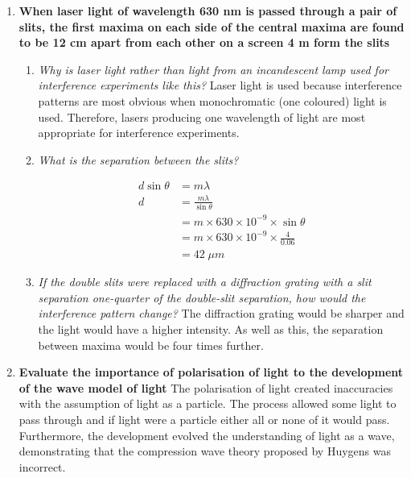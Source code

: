 \documentclass{report}
\newcommand{\ta}{\theta}
\begin{document}
\begin{enumerate}
\begin{enumerate}
				\end{enumerate}

			\item \textbf{When laser light of wavelength 630 nm is passed through a pair of slits, the first maxima on each side of the central maxima are found to be 12 cm apart from each other on a screen 4 m form the slits}
				\begin{enumerate}
					\item \textit{Why is laser light rather than light from an incandescent lamp used for interference experiments like this?}
						\subitem Laser light is used because interference patterns are most obvious when monochromatic (one coloured) light is used. Therefore, lasers producing one wavelength of light are most appropriate for interference experiments.

					\item \textit{What is the separation between the slits?}

						\begin{align*}
							d \sin{\theta} &= m \lambda	\\
							d &= \frac{m \lambda}{\sin{\ta}} 	\\
							  &= m \times 630 \times 10^{-9} \times \sin{\ta} \\
							  &= m \times 630 \times 10^{-9} \times  \frac{4}{0.06} \\
							  &= 42 \; \mu m
						\end{align*}

					\item \textit{If the double slits were replaced with a diffraction grating with a slit separation one-quarter of the double-slit separation, how would the interference pattern change?}
						\subitem The diffraction grating would be sharper and the light would have a higher intensity. As well as this, the separation between maxima would be four times further.
				\end{enumerate}

			\item \textbf{Evaluate the importance of polarisation of light to the development of the wave model of light}
				\subitem The polarisation of light created inaccuracies with the assumption of light as a particle. The process allowed some light to pass through and if light were a particle either all or none of it would pass. Furthermore, the development evolved the understanding of light as a wave, demonstrating that the compression wave theory proposed by Huygens was incorrect.


\end{enumerate}
\end{document}
